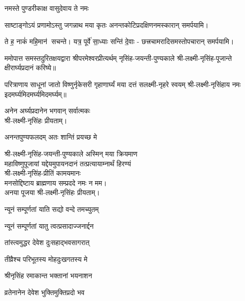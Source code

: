 \begin{center}
{नमस्ते पुण्डरीकाक्ष वासुदेवाय ते नमः}

{साष्टाङ्गोऽयं प्रणामोऽस्तु जगन्नाथ मया कृतः}
अनन्तकोटिप्रदक्षिणनमस्कारान् समर्पयामि।\medskip

{ते ह॒ नाकं॑ महि॒मान॑ सचन्ते। यत्र॒ पूर्वे॑ सा॒ध्याः सन्ति॑ दे॒वाः}
- छत्त्रचामरादिसमस्तोपचारान् समर्पयामि।\medskip

ममोपात्त समस्तदुरितक्षयद्वारा श्रीपरमेश्वरप्रीत्यर्थम्  नृसिंह-जयन्ती-पुण्यकाले  श्री-लक्ष्मी-नृसिंह-पूजान्ते क्षीरार्घ्यप्रदानं करिष्ये॥
\medskip

{परित्राणाय   साधूनां   जातो   विष्णुर्नृकेसरी}
{गृहाणार्घ्यं   मया   दत्तं   सलक्ष्मी-नृहरे   स्वयम्}
	श्री-लक्ष्मी-नृसिंहाय नमः इदमर्घ्यमिदमर्घ्यमिदमर्घ्यम्॥\medskip

अनेन अर्घ्यप्रदानेन भगवान् सर्वात्मकः\\ श्री-लक्ष्मी-नृसिंहः प्रीयताम्।\medskip

{अनन्तपुण्यफलदम् अतः शान्तिं प्रयच्छ मे}

श्री-लक्ष्मी-नृसिंह-जयन्ती-पुण्यकाले अस्मिन् मया क्रियमाण\\
महाविष्णुपूजायां यद्देयमुपायनदानं तत्प्रत्यायाम्नार्थं हिरण्यं\\
श्री-लक्ष्मी-नृसिंह-प्रीतिं कामयमानः\\
मनसोद्दिष्टाय ब्राह्मणाय सम्प्रददे नमः न मम।\\ 
अनया पूजया श्री-लक्ष्मी-नृसिंहः प्रीयताम्। 
 

{न्यूनं सम्पूर्णतां याति सद्यो वन्दे तमच्युतम्}

{न्यूनं सम्पूर्णतां यातु त्वत्प्रसादाज्जनार्द्दन}

{तांस्त्वमुद्धर   देवेश   दुःसहाद्भवसागरात्}

{तीव्रैश्च  परिभूतस्य   मोहदुःखगतस्य   मे}

{श्रीनृसिंह   रमाकान्त   भक्तानां   भयनाशन}

{व्रतेनानेन   देवेश   भुक्तिमुक्तिप्रदो   भव}


\end{center}
